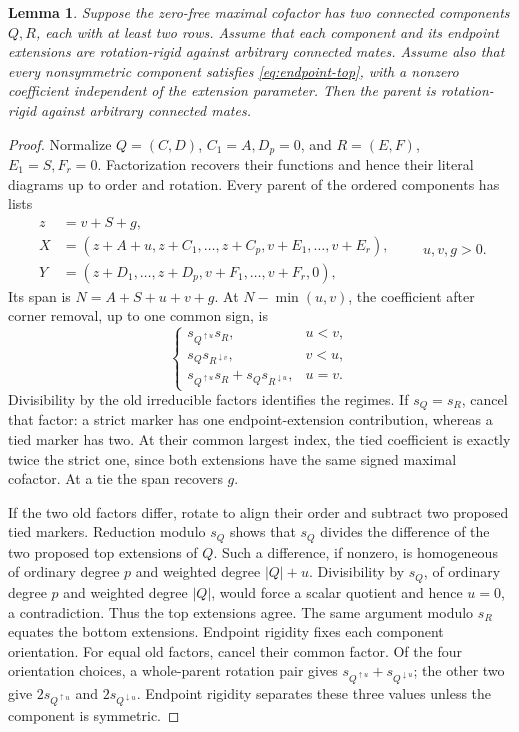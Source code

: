 \documentclass[11pt,a4paper]{amsart}
\numberwithin{equation}{section}
\theoremstyle{plain}
\newtheorem{lemma}[theorem]{Lemma}
\theoremstyle{definition}
\begin{document}
\begin{lemma}\label{lem:two-component-lift}
Suppose the zero-free maximal cofactor has two connected components \(Q,R\), each with at least two rows.  Assume that each component and its endpoint extensions are rotation-rigid against arbitrary connected mates.  Assume also that every nonsymmetric component satisfies \eqref{eq:endpoint-top}, with a nonzero coefficient independent of the extension parameter.  Then the parent is rotation-rigid against arbitrary connected mates.
\end{lemma}

\begin{proof}
Normalize \(Q=(C,D)\), \(C_1=A,D_p=0\), and \(R=(E,F)\), \(E_1=S,F_r=0\).  Factorization recovers their functions and hence their literal diagrams up to order and rotation.  Every parent of the ordered components has lists
\begin{equation}\label{eq:two-component-lists}
 \begin{aligned}
 z&=v+S+g,\\
 X&=(z+A+u,z+C_1,\ldots,z+C_p,v+E_1,\ldots,v+E_r),\\
 Y&=(z+D_1,\ldots,z+D_p,v+F_1,\ldots,v+F_r,0),
 \end{aligned}
 \qquad u,v,g>0.
\end{equation}
Its span is \(N=A+S+u+v+g\).  At \(N-\min(u,v)\), the coefficient after corner removal, up to one common sign, is
\begin{equation}\label{eq:two-component-marker}
 \begin{cases}
 s_{Q^{\uparrow u}}s_R,&u<v,\\
 s_Qs_{R^{\downarrow v}},&v<u,\\
 s_{Q^{\uparrow u}}s_R+s_Qs_{R^{\downarrow u}},&u=v.
 \end{cases}
\end{equation}
Divisibility by the old irreducible factors identifies the regimes.  If \(s_Q=s_R\), cancel that factor: a strict marker has one endpoint-extension contribution, whereas a tied marker has two.  At their common largest index, the tied coefficient is exactly twice the strict one, since both extensions have the same signed maximal cofactor.  At a tie the span recovers \(g\).

If the two old factors differ, rotate to align their order and subtract two proposed tied markers.  Reduction modulo \(s_Q\) shows that \(s_Q\) divides the difference of the two proposed top extensions of \(Q\).  Such a difference, if nonzero, is homogeneous of ordinary degree \(p\) and weighted degree \(|Q|+u\).  Divisibility by \(s_Q\), of ordinary degree \(p\) and weighted degree \(|Q|\), would force a scalar quotient and hence \(u=0\), a contradiction.  Thus the top extensions agree.  The same argument modulo \(s_R\) equates the bottom extensions.  Endpoint rigidity fixes each component orientation.  For equal old factors, cancel their common factor.  Of the four orientation choices, a whole-parent rotation pair gives \(s_{Q^{\uparrow u}}+s_{Q^{\downarrow u}}\); the other two give \(2s_{Q^{\uparrow u}}\) and \(2s_{Q^{\downarrow u}}\).  Endpoint rigidity separates these three values unless the component is symmetric.


\end{proof}
\end{document}
